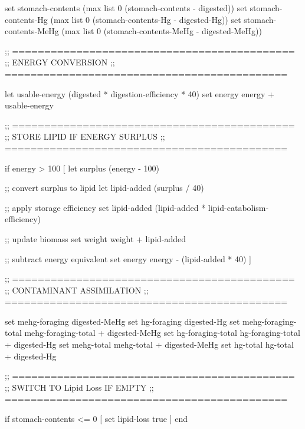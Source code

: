 \documentclass[
]{book}
\newenvironment{Shaded}{\begin{snugshade}}{\end{snugshade}}
\newcommand{\NormalTok}[1]{#1}
\begin{document}
\begin{Shaded}
\begin{Highlighting}[]
\NormalTok{  set stomach{-}contents     (max list 0 (stomach{-}contents {-} digested))}
\NormalTok{  set stomach{-}contents{-}Hg  (max list 0 (stomach{-}contents{-}Hg {-} digested{-}Hg))}
\NormalTok{  set stomach{-}contents{-}MeHg (max list 0 (stomach{-}contents{-}MeHg {-} digested{-}MeHg))}

\NormalTok{  ;; ============================================}
\NormalTok{  ;; ENERGY CONVERSION}
\NormalTok{  ;; ============================================}

\NormalTok{  let usable{-}energy (digested * digestion{-}efficiency * 40)}
\NormalTok{  set energy energy + usable{-}energy}

\NormalTok{  ;; ============================================}
\NormalTok{  ;; STORE LIPID IF ENERGY SURPLUS}
\NormalTok{  ;; ============================================}

\NormalTok{  if energy \textgreater{} 100 [}
\NormalTok{    let surplus (energy {-} 100)}

\NormalTok{    ;; convert surplus to lipid}
\NormalTok{    let lipid{-}added (surplus / 40)}

\NormalTok{    ;; apply storage efficiency}
\NormalTok{    set lipid{-}added (lipid{-}added * lipid{-}catabolism{-}efficiency)}

\NormalTok{    ;; update biomass}
\NormalTok{    set weight weight + lipid{-}added}

\NormalTok{    ;; subtract energy equivalent}
\NormalTok{    set energy energy {-} (lipid{-}added * 40)}
\NormalTok{  ]}

\NormalTok{  ;; ============================================}
\NormalTok{  ;; CONTAMINANT ASSIMILATION}
\NormalTok{  ;; ============================================}

\NormalTok{  set mehg{-}foraging          digested{-}MeHg}
\NormalTok{  set hg{-}foraging            digested{-}Hg}
\NormalTok{  set mehg{-}foraging{-}total    mehg{-}foraging{-}total + digested{-}MeHg}
\NormalTok{  set hg{-}foraging{-}total      hg{-}foraging{-}total + digested{-}Hg}
\NormalTok{  set mehg{-}total             mehg{-}total + digested{-}MeHg}
\NormalTok{  set hg{-}total               hg{-}total + digested{-}Hg}

\NormalTok{  ;; ============================================}
\NormalTok{  ;; SWITCH TO Lipid Loss IF EMPTY}
\NormalTok{  ;; ============================================}

\NormalTok{  if stomach{-}contents \textless{}= 0 [}
\NormalTok{    set lipid{-}loss true}
\NormalTok{  ]}
\NormalTok{end}
\end{Highlighting}
\end{Shaded}
\end{document}

